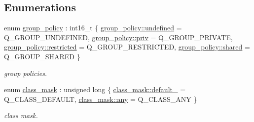 \subsection*{Enumerations}
\begin{DoxyCompactItemize}
\item 
enum \hyperlink{namespacenet_aedc1a0dde937ddbd0800af02920b1067}{group\-\_\-policy} \-: int16\-\_\-t \{ \hyperlink{namespacenet_aedc1a0dde937ddbd0800af02920b1067a5e543256c480ac577d30f76f9120eb74}{group\-\_\-policy\-::undefined} = Q\-\_\-\-G\-R\-O\-U\-P\-\_\-\-U\-N\-D\-E\-F\-I\-N\-E\-D, 
\hyperlink{namespacenet_aedc1a0dde937ddbd0800af02920b1067a908b453051b556e053731714a5193921}{group\-\_\-policy\-::priv} = Q\-\_\-\-G\-R\-O\-U\-P\-\_\-\-P\-R\-I\-V\-A\-T\-E, 
\hyperlink{namespacenet_aedc1a0dde937ddbd0800af02920b1067ac89b33f8b3f6f452ef6f07d397b5dcdf}{group\-\_\-policy\-::restricted} = Q\-\_\-\-G\-R\-O\-U\-P\-\_\-\-R\-E\-S\-T\-R\-I\-C\-T\-E\-D, 
\hyperlink{namespacenet_aedc1a0dde937ddbd0800af02920b1067a9e81e7b963c71363e2fb3eefcfecfc0e}{group\-\_\-policy\-::shared} = Q\-\_\-\-G\-R\-O\-U\-P\-\_\-\-S\-H\-A\-R\-E\-D
 \}
\begin{DoxyCompactList}\small\item\em group policies. \end{DoxyCompactList}\item 
enum \hyperlink{namespacenet_a1dbd93552dc6ef6fbb0bb79d43ca22fd}{class\-\_\-mask} \-: unsigned long \{ \hyperlink{namespacenet_a1dbd93552dc6ef6fbb0bb79d43ca22fda172b03053216c6158fe380805998ad6c}{class\-\_\-mask\-::default\-\_\-} = Q\-\_\-\-C\-L\-A\-S\-S\-\_\-\-D\-E\-F\-A\-U\-L\-T, 
\hyperlink{namespacenet_a1dbd93552dc6ef6fbb0bb79d43ca22fda100b8cad7cf2a56f6df78f171f97a1ec}{class\-\_\-mask\-::any} = Q\-\_\-\-C\-L\-A\-S\-S\-\_\-\-A\-N\-Y
 \}
\begin{DoxyCompactList}\small\item\em class mask. \end{DoxyCompactList}\end{DoxyCompactItemize}
